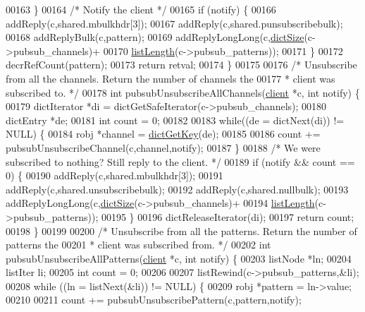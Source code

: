 \begin{DoxyCode}
00163     \}
00164     \textcolor{comment}{/* Notify the client */}
00165     \textcolor{keywordflow}{if} (notify) \{
00166         addReply(c,shared.mbulkhdr[3]);
00167         addReply(c,shared.punsubscribebulk);
00168         addReplyBulk(c,pattern);
00169         addReplyLongLong(c,\hyperlink{dict_8h_af193430dd3d5579a52b194512f72c1f0}{dictSize}(c->pubsub\_channels)+
00170                        \hyperlink{adlist_8h_afde0ab079f934670e82119b43120e94b}{listLength}(c->pubsub\_patterns));
00171     \}
00172     decrRefCount(pattern);
00173     \textcolor{keywordflow}{return} retval;
00174 \}
00175 
00176 \textcolor{comment}{/* Unsubscribe from all the channels. Return the number of channels the}
00177 \textcolor{comment}{ * client was subscribed to. */}
00178 \textcolor{keywordtype}{int} pubsubUnsubscribeAllChannels(\hyperlink{structclient}{client} *c, \textcolor{keywordtype}{int} notify) \{
00179     dictIterator *di = dictGetSafeIterator(c->pubsub\_channels);
00180     dictEntry *de;
00181     \textcolor{keywordtype}{int} count = 0;
00182 
00183     \textcolor{keywordflow}{while}((de = dictNext(di)) != NULL) \{
00184         robj *channel = \hyperlink{dict_8h_a3271c334309904a3086deca94f96e46e}{dictGetKey}(de);
00185 
00186         count += pubsubUnsubscribeChannel(c,channel,notify);
00187     \}
00188     \textcolor{comment}{/* We were subscribed to nothing? Still reply to the client. */}
00189     \textcolor{keywordflow}{if} (notify && count == 0) \{
00190         addReply(c,shared.mbulkhdr[3]);
00191         addReply(c,shared.unsubscribebulk);
00192         addReply(c,shared.nullbulk);
00193         addReplyLongLong(c,\hyperlink{dict_8h_af193430dd3d5579a52b194512f72c1f0}{dictSize}(c->pubsub\_channels)+
00194                        \hyperlink{adlist_8h_afde0ab079f934670e82119b43120e94b}{listLength}(c->pubsub\_patterns));
00195     \}
00196     dictReleaseIterator(di);
00197     \textcolor{keywordflow}{return} count;
00198 \}
00199 
00200 \textcolor{comment}{/* Unsubscribe from all the patterns. Return the number of patterns the}
00201 \textcolor{comment}{ * client was subscribed from. */}
00202 \textcolor{keywordtype}{int} pubsubUnsubscribeAllPatterns(\hyperlink{structclient}{client} *c, \textcolor{keywordtype}{int} notify) \{
00203     listNode *ln;
00204     listIter li;
00205     \textcolor{keywordtype}{int} count = 0;
00206 
00207     listRewind(c->pubsub\_patterns,&li);
00208     \textcolor{keywordflow}{while} ((ln = listNext(&li)) != NULL) \{
00209         robj *pattern = ln->value;
00210 
00211         count += pubsubUnsubscribePattern(c,pattern,notify);

\end{DoxyCode}
